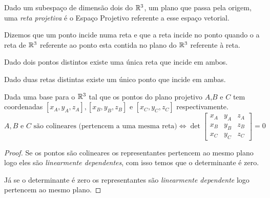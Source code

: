 \begin{defn}
Dado um subespaço de dimensão dois do $\mathbb{R}^3$, um plano que passa pela origem, uma \emph{reta projetiva} é o Espaço Projetivo referente a esse espaço vetorial.
\end{defn}

\begin{defn}[Incidência]
Dizemos que um ponto incide numa reta e que a reta incide no ponto quando o a reta de $\mathbb{R}^3$ referente ao ponto esta contida no plano do $\mathbb{R}^3$ referente à reta.
\end{defn}

\begin{cor}
Dado dois pontos distintos existe uma única reta que incide em ambos.
\end{cor}

\begin{cor}
Dado duas retas distintas existe um único ponto que incide em ambas.
\end{cor}

\begin{thm}
Dada uma base para o $\mathbb{R}^3$ tal que os pontos do plano projetivo $A$,$B$ e $C$ tem coordenadas $[x_A,y_A,z_A], [x_B,y_B,z_B]$ e $[x_C,y_C,z_C]$ respectivamente. 
\[A,B \text{ e } C \text{ são colineares (pertencem a uma mesma reta)} \iff \det \begin{bmatrix} x_A & y_A & z_A \\ x_B & y_B & z_B \\ x_C & y_C & z_C \end{bmatrix} = 0\]
\end{thm}

\begin{proof}
Se os pontos são colineares os representantes pertencem ao mesmo plano logo eles são \textit{linearmente dependentes}, com isso temos que o determinante é zero.

Já se o determinante é zero os representantes são \textit{linearmente dependente} logo pertencem ao mesmo plano.
\end{proof}



